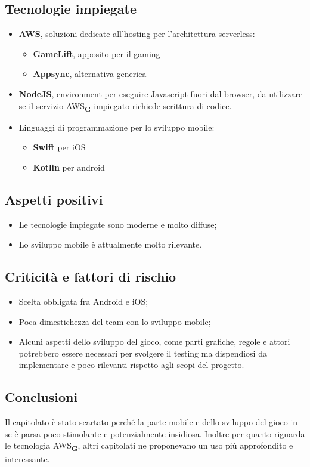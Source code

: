 \subsection{Tecnologie impiegate}
\begin{itemize}
    \item \textbf{AWS}, soluzioni dedicate all'hosting per l'architettura serverless:
    \begin{itemize}
        \item \textbf{GameLift}, apposito per il gaming
        \item \textbf{Appsync}, alternativa generica
    \end{itemize}
    \item \textbf{NodeJS}, environment per eseguire Javascript fuori dal browser, da utilizzare se il servizio AWS\textsubscript{\textbf{G}} impiegato richiede scrittura di codice.
    \item Linguaggi di programmazione per lo sviluppo mobile: 
    \begin{itemize}
        \item \textbf{Swift} per iOS
        \item \textbf{Kotlin} per android
    \end{itemize}
\end{itemize}
\subsection{Aspetti positivi}
\begin{itemize}
    \item Le tecnologie impiegate sono moderne e molto diffuse;
    \item Lo sviluppo mobile \`e attualmente molto rilevante.
\end{itemize}
\subsection{Criticit\`a e fattori di rischio}
\begin{itemize}
    \item Scelta obbligata fra Android e iOS;
    \item Poca dimestichezza del team con lo sviluppo mobile;
    \item Alcuni aspetti dello sviluppo del gioco, come parti grafiche, regole e attori potrebbero essere necessari per svolgere il testing ma dispendiosi da implementare e poco rilevanti rispetto agli scopi del progetto.
\end{itemize}
\subsection{Conclusioni}
Il capitolato \`e stato scartato perch\'e la parte mobile e dello sviluppo del gioco in se \`e parsa poco stimolante e potenzialmente insidiosa. Inoltre per quanto riguarda le tecnologia AWS\textsubscript{\textbf{G}}, altri capitolati ne proponevano un uso più approfondito e interessante.